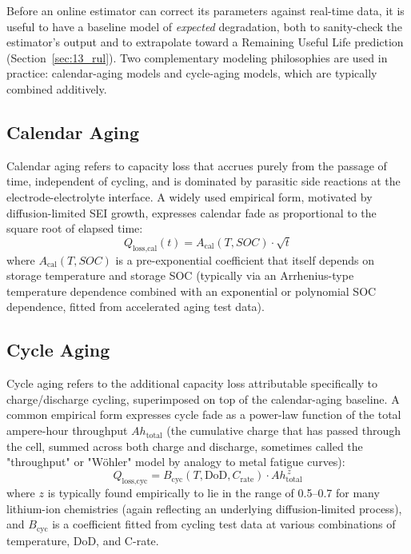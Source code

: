 Before an online estimator can correct its parameters against real-time data, it is useful to have a baseline model of \emph{expected} degradation, both to sanity-check the estimator's output and to extrapolate toward a Remaining Useful Life prediction (Section~\ref{sec:13_rul}). Two complementary modeling philosophies are used in practice: calendar-aging models and cycle-aging models, which are typically combined additively.

\subsection{Calendar Aging}
\label{subsec:13_calendar_aging}

Calendar aging refers to capacity loss that accrues purely from the passage of time, independent of cycling, and is dominated by parasitic side reactions at the electrode-electrolyte interface. A widely used empirical form, motivated by diffusion-limited SEI growth, expresses calendar fade as proportional to the square root of elapsed time:
\begin{equation}
    Q_{\text{loss,cal}}(t) = A_{\text{cal}}(T, SOC) \cdot \sqrt{t}
    \label{eq:13_calendar_fade}
\end{equation}
where $A_{\text{cal}}(T, SOC)$ is a pre-exponential coefficient that itself depends on storage temperature and storage SOC (typically via an Arrhenius-type temperature dependence combined with an exponential or polynomial SOC dependence, fitted from accelerated aging test data).

\subsection{Cycle Aging}
\label{subsec:13_cycle_aging}

Cycle aging refers to the additional capacity loss attributable specifically to charge/discharge cycling, superimposed on top of the calendar-aging baseline. A common empirical form expresses cycle fade as a power-law function of the total ampere-hour throughput $Ah_{\text{total}}$ (the cumulative charge that has passed through the cell, summed across both charge and discharge, sometimes called the "throughput" or "Wöhler" model by analogy to metal fatigue curves):
\begin{equation}
    Q_{\text{loss,cyc}} = B_{\text{cyc}}(T, \text{DoD}, C_{\text{rate}}) \cdot Ah_{\text{total}}^{\,z}
    \label{eq:13_cycle_fade}
\end{equation}
where $z$ is typically found empirically to lie in the range of 0.5–0.7 for many lithium-ion chemistries (again reflecting an underlying diffusion-limited process), and $B_{\text{cyc}}$ is a coefficient fitted from cycling test data at various combinations of temperature, DoD, and C-rate.

